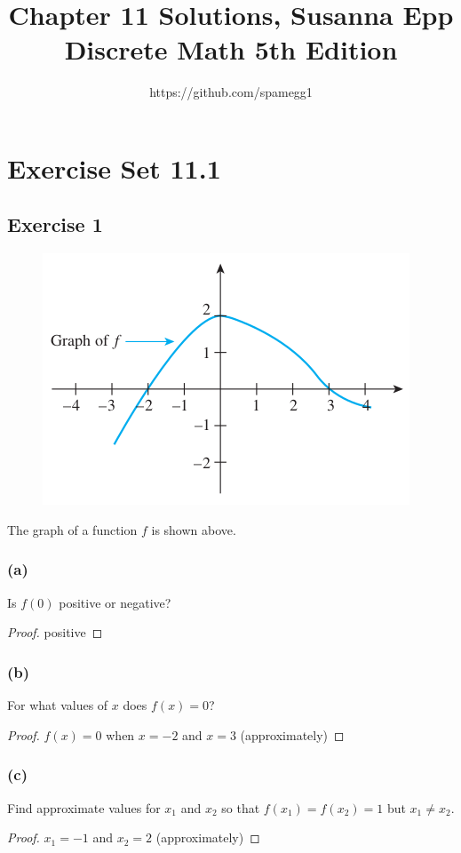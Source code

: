 \documentclass[14pt]{extarticle}
\title{Chapter 11 Solutions, Susanna Epp Discrete Math 5th Edition}
\author{https://github.com/spamegg1}
\begin{document}
\maketitle
\tableofcontents


\section{Exercise Set 11.1}

\subsection{Exercise 1}
\begin{figure}[ht!]
    \centering
    \includegraphics[scale=0.5]{../images/11.1.1.png}
\end{figure}

The graph of a function \(f\) is shown above.

\subsubsection{(a)}
Is \(f(0)\) positive or negative?
\begin{proof}
    positive
\end{proof}

\subsubsection{(b)}
For what values of \(x\) does \(f(x) = 0\)?
\begin{proof}
    \(f(x) = 0\) when \(x = -2\) and \(x = 3\) (approximately)
\end{proof}

\subsubsection{(c)}
Find approximate values for \(x_1\) and \(x_2\) so that \(f(x_1) = f(x_2) = 1\) but \(x_1 \neq x_2\).
\begin{proof}
    \(x_1 = -1\) and \(x_2 = 2\) (approximately)
\end{proof}
\end{document}
